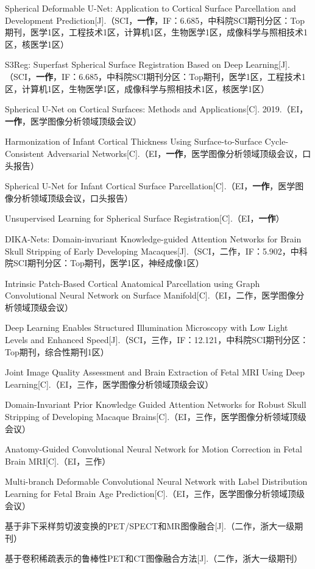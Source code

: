 \cleardoublepage
{}


\noindent [1] Spherical Deformable U-Net: Application to Cortical Surface Parcellation and Development Prediction[J].（SCI，\textbf{一作}，IF：6.685，中科院SCI期刊分区：Top期刊，医学1区，工程技术1区，计算机1区，生物医学1区，成像科学与照相技术1区，核医学1区）

\noindent [2] S3Reg: Superfast Spherical Surface Registration Based on Deep Learning[J].（SCI，\textbf{一作}，IF：6.685，中科院SCI期刊分区：Top期刊，医学1区，工程技术1区，计算机1区，生物医学1区，成像科学与照相技术1区，核医学1区）

\noindent [3] Spherical U-Net on Cortical Surfaces: Methods and Applications[C]. 2019.（EI，\textbf{一作}，医学图像分析领域顶级会议）

\noindent [4] Harmonization of Infant Cortical Thickness Using Surface-to-Surface Cycle-Consistent Adversarial Networks[C].（EI，\textbf{一作}，医学图像分析领域顶级会议，口头报告）

\noindent [5] Spherical U-Net for Infant Cortical Surface Parcellation[C].（EI，\textbf{一作}，医学图像分析领域顶级会议，口头报告）

\noindent [6] Unsupervised Learning for Spherical Surface Registration[C].（EI，\textbf{一作}）

\noindent [7] DIKA-Nets: Domain-invariant Knowledge-guided Attention Networks for Brain Skull Stripping of Early Developing Macaques[J].（SCI，二作，IF：5.902，中科院SCI期刊分区：Top期刊，医学1区，神经成像1区） 

\noindent [8] Intrinsic Patch-Based Cortical Anatomical Parcellation using Graph Convolutional Neural Network on Surface Manifold[C].（EI，二作，医学图像分析领域顶级会议）

\noindent [9] Deep Learning Enables Structured Illumination Microscopy with Low Light Levels and Enhanced Speed[J].（SCI，三作，IF：12.121，中科院SCI期刊分区：Top期刊，综合性期刊1区）

\noindent [10] Joint Image Quality Assessment and Brain Extraction of Fetal MRI Using Deep Learning[C].（EI，三作，医学图像分析领域顶级会议）

\noindent [11] Domain-Invariant Prior Knowledge Guided Attention Networks for Robust Skull Stripping of Developing Macaque Brains[C].（EI，三作，医学图像分析领域顶级会议）

\noindent [12] Anatomy-Guided Convolutional Neural Network for Motion Correction in Fetal Brain MRI[C].（EI，三作）

\noindent [13] Multi-branch Deformable Convolutional Neural Network with Label Distribution Learning for Fetal Brain Age Prediction[C].（EI，三作，医学图像分析领域顶级会议）

\noindent [14] 基于非下采样剪切波变换的PET/SPECT和MR图像融合[J].（二作，浙大一级期刊）

\noindent [15] 基于卷积稀疏表示的鲁棒性PET和CT图像融合方法[J].（二作，浙大一级期刊）